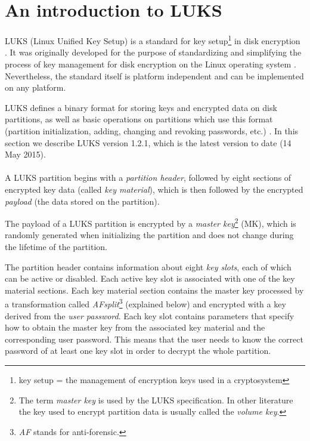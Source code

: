 \documentclass[12pt,oneside]{fithesis2}
\begin{document}
      \section{An introduction to LUKS} \label{s:luks}
      LUKS (Linux Unified Key Setup) is a standard for key setup\footnote{key setup = the management of encryption keys used in a cryptosystem} in disk encryption \cite{luks}. It was originally developed for the purpose of standardizing and simplifying the process of key management for disk encryption on the Linux operating system \cite[chapter 6]{Fruhwirth}. Nevertheless, the standard itself is platform independent and can be implemented on any platform.
      
      LUKS defines a binary format for storing keys and encrypted data on disk partitions, as well as basic operations on partitions which use this format (partition initialization, adding, changing and revoking passwords, etc.) \cite{luks}. In this section we describe LUKS version 1.2.1, which is the latest version to date (14 May 2015).
      
      \paragraph*{}
      A LUKS partition begins with a \emph{partition header}, followed by eight sections of encrypted key data (called \emph{key material}), which is then followed by the encrypted \emph{payload} (the data stored on the partition).
      
      The payload of a LUKS partition is encrypted by a \emph{master key}\footnote{The term \emph{master key} is used by the LUKS specification. In other literature the key used to encrypt partition data is usually called the \emph{volume key}.} (MK), which is randomly generated when initializing the partition and does not change during the lifetime of the partition.
      
      The partition header contains information about eight \emph{key slots}, each of which can be active or disabled. Each active key slot is associated with one of the key material sections. Each key material section contains the master key processed by a transformation called \emph{AFsplit}\footnote{\emph{AF} stands for anti-forensic.} (explained below) and encrypted with a key derived from the \emph{user password}. Each key slot contains parameters that specify how to obtain the master key from the associated key material and the corresponding user password. This means that the user needs to know the correct password of at least one key slot in order to decrypt the whole partition.
      
\end{document}
